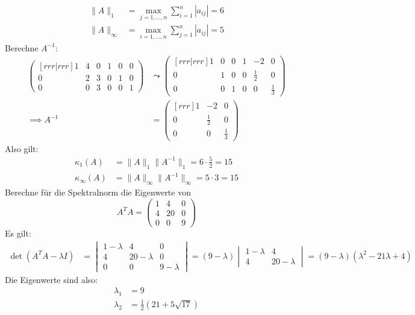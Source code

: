 \documentclass{mywork}
\begin{document}
\begin{aufgabe}
	\begin{align*}
		\|A\|_1 &= \max_{j=1,\dots,n}\sum_{i=1}^n|a_{ij}| = 6\\
  \|A\|_\infty &= \max_{i=1,\dots,n}\sum_{j=1}^n|a_{ij}| = 5
	\end{align*}
	Berechne $A^{-1}$:
	\begin{align*}
		\begin{pmatrix}[rrr|rrr]1&4&0&1&0&0\\0&2&3&0&1&0\\0&0&3&0&0&1\end{pmatrix}
		&\leadsto \begin{pmatrix}[rrr|rrr]1&0&0&1&-2&0\\0&1&0&0&\frac 12&0\\0&0&1&0&0&\frac 13\end{pmatrix}\\
		\implies A^{-1} &= \begin{pmatrix}[rrr]1&-2&0\\0&\frac 12&0\\0&0&\frac 13\end{pmatrix}
	\end{align*}
	Also gilt:
	\begin{align*}
		\kappa_1(A)&=\|A\|_1\|A^{-1}\|_1=6\cdot \frac 52=15\\
   \kappa_\infty(A)&=\|A\|_\infty\|A^{-1}\|_\infty=5\cdot 3=15
	\end{align*}
	Berechne für die Spektralnorm die Eigenwerte von
	\[
		A^TA=\begin{pmatrix}1&4&0\\4&20&0\\0&0&9\end{pmatrix}
	\]
	Es gilt:
	\begin{align*}
		\det(A^TA-\lambda I)&=\begin{vmatrix}1-\lambda&4&0\\4&20-\lambda&0\\0&0&9-\lambda\end{vmatrix}
		=(9-\lambda)\begin{vmatrix}1-\lambda&4\\4&20-\lambda\end{vmatrix}
		=(9-\lambda)(\lambda^2-21\lambda+4)
	\end{align*}
	Die Eigenwerte sind also:
	\begin{align*}
		\lambda_1&=9\\
		\lambda_2&=\frac 12(21+5\sqrt{17})\\

\end{align*}
\end{aufgabe}
\end{document}
